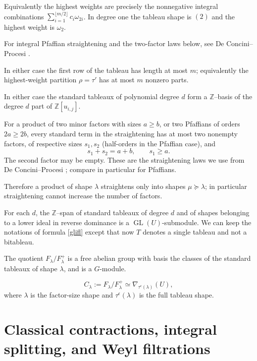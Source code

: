 \documentclass[10pt]{amsart}
\theoremstyle{definition}
\theoremstyle{remark}
\newcommand{\Z}{\mathbb Z}
\newcommand{\GL}{\operatorname{GL}}
\begin{document}
Equivalently the highest
weights are precisely the nonnegative integral combinations
$\sum_{i=1}^{\lfloor m/2\rfloor}c_i\omega_{2i}$.
In degree one the tableau shape is $(2)$ and the highest
weight is $\omega_2$.  \smallskip

For integral Pfaffian straightening and the two-factor
laws below, see De Concini--Procesi
\cite[Lemmas~6.1--6.2 and Theorem~6.5]{DeConciniProcesi1976}.\smallskip

In either case the first row of the tableau has length at most
$m$; equivalently the highest-weight partition $\rho=\tau'$
has at most $m$ nonzero parts.\smallskip



In either case the standard tableaux of polynomial degree $d$
form a $\Z$--basis of the degree $d$  part of $\Z[u_{i,j}]$.\smallskip

 For a product of  two minor factors with sizes $a\ge b$,
or two Pfaffians of orders $2a\ge2b$, every standard term in
the straightening has at most two nonempty factors, of respective
sizes $s_1,s_2$ (half-orders in the Pfaffian case), and
\[
 s_1+s_2=a+b,\qquad s_1\ge a.
\]
The second factor may be empty. These are the straightening
laws we use from De Concini--Procesi
\cite{DeConciniProcesi1976}; compare in particular
\cite[Theorem~6.5]{DeConciniProcesi1976} for Pfaffians.\smallskip


Therefore a product of
  shape $\lambda$
straightens only into shapes $\mu \succeq\lambda$; in particular
straightening cannot increase the number of factors.\smallskip



For each $d$, the $\Z$--span of standard tableaux of degree $d$ and of  shapes
belonging to a lower ideal in reverse dominance is a
$\GL(U)$-submodule.   We can keep the notations   of formula \eqref{glifl} except that now $T$ denotes a single tableau and not a bitableau.\smallskip



The quotient $ F_\lambda/ F^+_{\lambda}$  is a free abelian group with basis the classes of the standard tableaux of shape $\lambda$, and is a $G$-module.
 
 \begin{equation} \label{clams1}
 C_\lambda:=F_\lambda/F^+_\lambda\simeq\nabla_{\tau^\epsilon(\lambda)}(U),
\end{equation}
where $\lambda$ is the factor-size shape and $\tau^\epsilon(\lambda)$ is the full tableau shape.
 
\section{Classical contractions, integral splitting, and Weyl filtrations}
\label{sec:classical-divided-powers}
 
\end{document}
